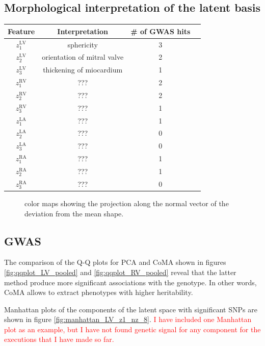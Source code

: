 \documentclass[twocolumn]{llncs}
\begin{document}
\subsection{Morphological interpretation of the latent basis}

\begin{center}
\begin{tabular}{ |c|c|c|c| } 
\hline
Feature & Interpretation & \# of GWAS hits \\
\hline
$z_1^{\text{LV}}$ & sphericity & 3 \\ 
\hline
$z_2^{\text{LV}}$ & orientation of mitral valve & 2\\ 
\hline
$z_3^{\text{LV}}$ & thickening of miocardium & 1 \\ 
\hline
$z_1^{\text{RV}}$ & ??? & 2 \\ 
\hline
$z_2^{\text{RV}}$ & ??? & 2 \\ 
\hline
$z_3^{\text{RV}}$ & ??? & 1 \\ 
\hline
$z_1^{\text{LA}}$ & ???  & 1 \\ 
\hline
$z_2^{\text{LA}}$ & ??? & 0 \\ 
\hline
$z_3^{\text{LA}}$ & ??? & 0 \\ 
\hline
$z_1^{\text{RA}}$ & ??? & 1 \\ 
\hline
$z_2^{\text{RA}}$ & ??? & 1 \\ 
\hline
$z_3^{\text{RA}}$ & ??? & 0 \\ 
\hline
\end{tabular}
\end{center}

\begin{figure}
\caption{color maps showing the projection along the normal vector of the deviation from the mean shape.}
\end{figure}


\subsection{GWAS}

The comparison of the Q-Q plots for PCA and CoMA shown in figures \ref{fig:qqplot_LV_pooled} and \ref{fig:qqplot_RV_pooled} reveal that the latter method produce more significant associations with the genotype. In other words, CoMA allows to extract phenotypes with higher heritability.

Manhattan plots of the components of the latent space with significant SNPs are shown in figure \ref{fig:manhattan_LV_z1_nz_8}. \textcolor{red}{I have included one Manhattan plot as an example, but I have not found genetic signal for any component for the executions that I have made so far.} 
\end{document}
